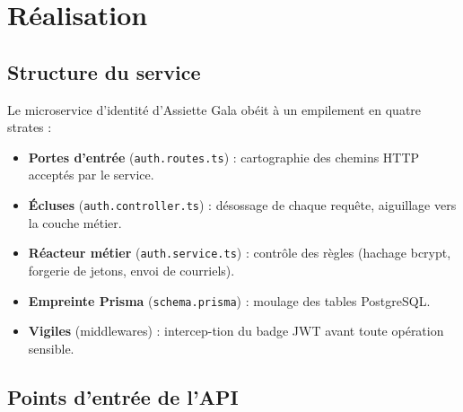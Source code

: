 \section{Réalisation}

\subsection{Structure du service}

Le microservice d'identité d'Assiette Gala obéit à un empilement en quatre strates :

\begin{itemize}
    \item \textbf{Portes d'entrée} (\texttt{auth.routes.ts}) : cartographie des chemins HTTP acceptés par le service.
    \item \textbf{Écluses} (\texttt{auth.controller.ts}) : désossage de chaque requête, aiguillage vers la couche métier.
    \item \textbf{Réacteur métier} (\texttt{auth.service.ts}) : contrôle des règles (hachage bcrypt, forgerie de jetons, envoi de courriels).
    \item \textbf{Empreinte Prisma} (\texttt{schema.prisma}) : moulage des tables PostgreSQL.
    \item \textbf{Vigiles} (middlewares) : intercep-tion du badge JWT avant toute opération sensible.
\end{itemize}

\subsection{Points d'entrée de l'API}

